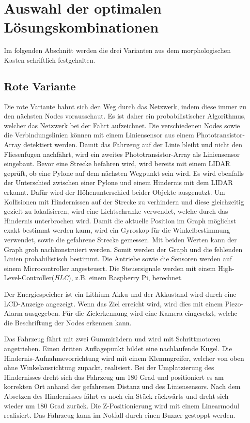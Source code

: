 \documentclass[main.tex]{subfiles} %
\begin{document}

\section{Auswahl der optimalen Lösungskombinationen}
Im folgenden Abschnitt werden die drei Varianten aus dem morphologischen Kasten
schriftlich festgehalten.

\subsection{Rote Variante}
Die rote Variante bahnt sich den Weg durch das Netzwerk, indem diese immer zu
den nächsten Nodes vorausschaut. Es ist daher ein probabilistischer
Algorithmus, welcher das Netzwerk bei der Fahrt aufzeichnet. Die verschiedenen
Nodes sowie die Verbindungslinien können mit einem Liniensensor aus einem
Phototransistor-Array detektiert werden. Damit das Fahrzeug auf der Linie
bleibt und nicht den Fliesenfugen nachfährt, wird ein zweites
Phototransistor-Array als Liniensensor eingebaut. Bevor eine Strecke befahren
wird, wird bereits mit einem LIDAR geprüft, ob eine Pylone auf dem nächsten
Wegpunkt sein wird. Es wird ebenfalls der Unterschied zwischen einer Pylone und
einem Hindernis mit dem LIDAR erkannt. Dafür wird der Höhenunterschied beider
Objekte ausgenutzt. Um Kollisionen mit Hindernissen auf der Strecke zu
verhindern und diese gleichzeitig gezielt zu lokalisieren, wird eine
Lichtschranke verwendet, welche durch das Hindernis unterbrochen wird. Damit
die aktuelle Position im Graph möglichst exakt bestimmt werden kann, wird ein
Gyroskop für die Winkelbestimmung verwendet, sowie die gefahrene Strecke
gemessen. Mit beiden Werten kann der Graph grob nachkonstruiert werden. Somit
werden der Graph und die fehlenden Linien probabilistisch bestimmt. Die
Antriebe sowie die Sensoren werden auf einem Microcontroller angesteuert. Die
Steuersignale werden mit einem High-Level-Controller(\textit{HLC}), z.B. einem
Raspberry Pi, berechnet.

Der Energiespeicher ist ein Lithium-Akku und der Akkustand wird durch eine
LCD-Anzeige angezeigt. Wenn das Ziel erreicht wird, wird dies mit einem
Piezo-Alarm ausgegeben. Für die Zielerkennung wird eine Kamera eingesetzt,
welche die Beschriftung der Nodes erkennen kann.

Das Fahrzeug fährt mit zwei Gummirädern und wird mit
Schrittmotoren angetrieben. Einen dritten Auflagepunkt bildet eine nachlaufende Kugel. Die Hindernis-Aufnahmevorrichtung
wird mit einem Klemmgreifer, welcher von oben ohne Winkelausrichtung zupackt,
realisiert. Bei der Umplatzierung des Hindernisses dreht sich das Fahrzeug um
180 Grad und positioniert es am korrekten Ort anhand der gefahrenen Distanz und
des Liniensensors. Nach dem Absetzen des Hindernisses fährt es noch ein Stück
rückwärts und dreht sich wieder um 180 Grad zurück. Die Z-Positionierung wird
mit einem Linearmodul realisiert. Das Fahrzeug kann im Notfall durch einen Buzzer
gestoppt werden.
\end{document}

